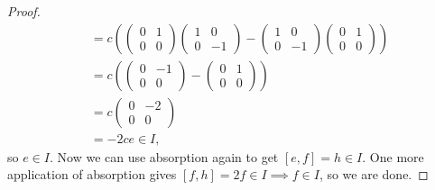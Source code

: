 \documentclass[12pt]{article}
\theoremstyle{definition}
\begin{document}
\begin{proof}
\begin{align*}
		              & = c \left( \begin{pmatrix}0 & 1 \\ 0 & 0\end{pmatrix}\begin{pmatrix}1 & 0 \\ 0 & -1\end{pmatrix} - \begin{pmatrix}1 & 0 \\ 0 & -1\end{pmatrix}\begin{pmatrix}0 & 1 \\ 0 & 0\end{pmatrix} \right) \\
		              & = c \left( \begin{pmatrix}0 & -1 \\ 0 & 0\end{pmatrix} - \begin{pmatrix}0 & 1 \\ 0 & 0\end{pmatrix} \right)                                                                                      \\
		              & = c \begin{pmatrix}0 & -2 \\ 0 & 0\end{pmatrix}                                                                                                                                                  \\
		              & = -2ce \in I,
	\end{align*}
  so $e \in I$.
  Now we can use absorption again to get $[e, f] = h \in I$. 
  One more application of absorption gives $[f, h] = 2f \in I \implies f \in I$, so we are done.
\end{proof}
\end{document}
